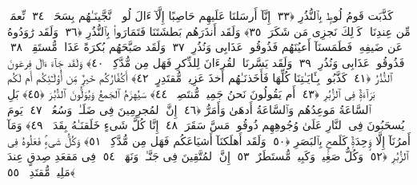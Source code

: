  كَذَّبَت قَومُ لُوطٍۭ بِٱلنُّذُرِ ﴿٣٣﴾
 إِنَّآ أَرسَلنَا عَلَيهِم حَاصِبًا إِلَّآ ءَالَ لُوطٍۢ ۖ نَّجَّينَـٰهُم بِسَحَرٍۢ ﴿٣٤﴾
 نِّعمَةًۭ مِّن عِندِنَا ۚ كَذَٟلِكَ نَجزِى مَن شَكَرَ ﴿٣٥﴾
 وَلَقَد أَنذَرَهُم بَطشَتَنَا فَتَمَارَوا۟ بِٱلنُّذُرِ ﴿٣٦﴾
 وَلَقَد رَٰوَدُوهُ عَن ضَيفِهِۦ فَطَمَسنَآ أَعيُنَهُم فَذُوقُوا۟ عَذَابِى وَنُذُرِ ﴿٣٧﴾
 وَلَقَد صَبَّحَهُم بُكرَةً عَذَابٌۭ مُّستَقِرٌّۭ ﴿٣٨﴾
 فَذُوقُوا۟ عَذَابِى وَنُذُرِ ﴿٣٩﴾
 وَلَقَد يَسَّرنَا ٱلقُرءَانَ لِلذِّكرِ فَهَل مِن مُّدَّكِرٍۢ ﴿٤٠﴾
 وَلَقَد جَآءَ ءَالَ فِرعَونَ ٱلنُّذُرُ ﴿٤١﴾
 كَذَّبُوا۟ بِـَٔايَـٰتِنَا كُلِّهَا فَأَخَذنَـٰهُم أَخذَ عَزِيزٍۢ مُّقتَدِرٍ ﴿٤٢﴾
 أَكُفَّارُكُم خَيرٌۭ مِّن أُو۟لَـٰٓئِكُم أَم لَكُم بَرَآءَةٌۭ فِى ٱلزُّبُرِ ﴿٤٣﴾
 أَم يَقُولُونَ نَحنُ جَمِيعٌۭ مُّنتَصِرٌۭ ﴿٤٤﴾
 سَيُهزَمُ ٱلجَمعُ وَيُوَلُّونَ ٱلدُّبُرَ ﴿٤٥﴾
 بَلِ ٱلسَّاعَةُ مَوعِدُهُم وَٱلسَّاعَةُ أَدهَىٰ وَأَمَرُّ ﴿٤٦﴾
 إِنَّ ٱلمُجرِمِينَ فِى ضَلَـٰلٍۢ وَسُعُرٍۢ ﴿٤٧﴾
 يَومَ يُسحَبُونَ فِى ٱلنَّارِ عَلَىٰ وُجُوهِهِم ذُوقُوا۟ مَسَّ سَقَرَ ﴿٤٨﴾
 إِنَّا كُلَّ شَىءٍ خَلَقنَـٰهُ بِقَدَرٍۢ ﴿٤٩﴾
 وَمَآ أَمرُنَآ إِلَّا وَٟحِدَةٌۭ كَلَمحٍۭ بِٱلبَصَرِ ﴿٥٠﴾
 وَلَقَد أَهلَكنَآ أَشيَاعَكُم فَهَل مِن مُّدَّكِرٍۢ ﴿٥١﴾
 وَكُلُّ شَىءٍۢ فَعَلُوهُ فِى ٱلزُّبُرِ ﴿٥٢﴾
 وَكُلُّ صَغِيرٍۢ وَكَبِيرٍۢ مُّستَطَرٌ ﴿٥٣﴾
 إِنَّ ٱلمُتَّقِينَ فِى جَنَّـٰتٍۢ وَنَهَرٍۢ ﴿٥٤﴾
 فِى مَقعَدِ صِدقٍ عِندَ مَلِيكٍۢ مُّقتَدِرٍۭ ﴿٥٥﴾
 
